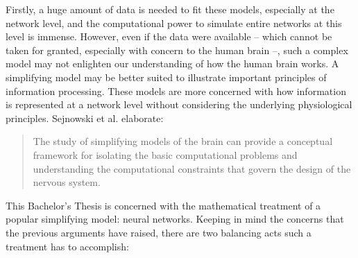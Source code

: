 \documentclass[a4paper,11pt]{report}
\begin{document}
Firstly, a huge amount of data is needed to fit these models, especially at the network level, and the computational power to simulate entire networks at this level is immense. However, even if the data were available -- which cannot be taken for granted, especially with concern to the human brain --, such a complex model may not enlighten our understanding of how the human brain works. A simplifying model may be better suited to illustrate important principles of information processing. These models are more concerned with how information is represented at a network level without considering the underlying physiological principles. Sejnowski et al. elaborate:
\begin{quote}
The study of simplifying models of the brain can provide a conceptual framework for isolating the basic computational problems and understanding the computational constraints that govern the design of the nervous system. \cite[][1300]{Sejnowski1988}
\end{quote}
This Bachelor's Thesis is concerned with the mathematical treatment of a popular simplifying model: neural networks. Keeping in mind the concerns that the previous arguments have raised, there are two balancing acts such a treatment has to accomplish:
\end{document}
